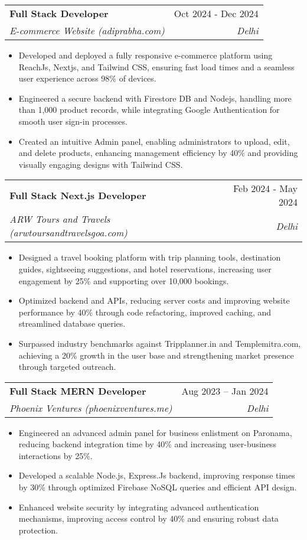 \documentclass[letterpaper,11pt]{article}
\makeatletter
\newcommand{\resumeItem}[1]{
  \item\small{
    {#1 \vspace{-2pt}}
  }
}
\newcommand{\resumeSubheading}[4]{
  \vspace{-2pt}\item
    \begin{tabular*}{0.97\textwidth}[t]{l@{\extracolsep{\fill}}r}
      \textbf{#1} & #2 \\
      \textit{\small#3} & \textit{\small #4} \\
    \end{tabular*}\vspace{-7pt}
}
\newcommand{\resumeItemListStart}{\begin{itemize}}
\newcommand{\resumeItemListEnd}{\end{itemize}\vspace{-5pt}}
\makeatother
\begin{document}
  \resumeSubheading  
    {Full Stack Developer}{Oct 2024 - Dec 2024}  
    {E-commerce Website (adiprabha.com)}{Delhi}  
    \resumeItemListStart  
      \resumeItem{Developed and deployed a fully responsive e-commerce platform using ReachJs, Nextjs, and Tailwind CSS, ensuring fast load times and a seamless user experience across 98\% of devices.}  
      \resumeItem{Engineered a secure backend with Firestore DB and Nodejs, handling more than 1,000 product records, while integrating Google Authentication for smooth user sign-in processes.}  
      \resumeItem{Created an intuitive Admin panel, enabling administrators to upload, edit, and delete products, enhancing management efficiency by 40\% and providing visually engaging designs with Tailwind CSS.}  
    \resumeItemListEnd


  \resumeSubheading  
    {Full Stack Next.js Developer}{Feb 2024 - May 2024}  
    {ARW Tours and Travels (arwtoursandtravelsgoa.com)}{Delhi}  
    \resumeItemListStart  
      \resumeItem{Designed a travel booking platform with trip planning tools, destination guides, sightseeing suggestions, and hotel reservations, increasing user engagement by 25\% and supporting over 10,000 bookings.}  
      \resumeItem{Optimized backend and APIs, reducing server costs and improving website performance by 40\% through code refactoring, improved caching, and streamlined database queries.}  
      \resumeItem{Surpassed industry benchmarks against Tripplanner.in and Templemitra.com, achieving a 20\% growth in the user base and strengthening market presence through targeted outreach.}  
    \resumeItemListEnd  

  \resumeSubheading  
    {Full Stack MERN Developer}{Aug 2023 -- Jan 2024}  
    {Phoenix Ventures (phoenixventures.me)}{Delhi}  
    \resumeItemListStart  
      \resumeItem{Engineered an advanced admin panel for business enlistment on Paronama, reducing backend integration time by 40\% and increasing user-business interactions by 25\%.}  
      \resumeItem{Developed a scalable Node.js, Express.Js backend, improving response times by 30\% through optimized Firebase NoSQL queries and efficient API design.}  
      \resumeItem{Enhanced website security by integrating advanced authentication mechanisms, improving access control by 40\% and ensuring robust data protection.}  
    \resumeItemListEnd  

\end{document}
